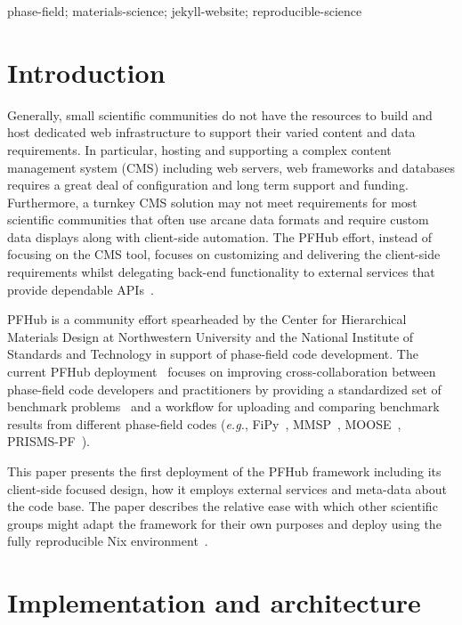 \documentclass{jors}
\begin{document}
phase-field; materials-science; jekyll-website; reproducible-science

\section*{Introduction}

Generally, small scientific communities do not have the resources to
build and host dedicated web infrastructure to support their varied
content and data requirements. In particular, hosting and supporting a
complex content management system (CMS) including web servers, web
frameworks and databases requires a great deal of configuration and
long term support and funding. Furthermore, a turnkey CMS solution may
not meet requirements for most scientific communities that often use
arcane data formats and require custom data displays along with
client-side automation. The PFHub effort, instead of focusing on the
CMS tool, focuses on customizing and delivering the client-side
requirements whilst delegating back-end functionality to external
services that provide dependable APIs~\cite{cmsfree}.

PFHub is a community effort spearheaded by the Center for Hierarchical
Materials Design at Northwestern University and the National Institute
of Standards and Technology in support of phase-field code
development. The current PFHub deployment~\cite{pfhub} focuses on
improving cross-collaboration between phase-field code developers and
practitioners by providing a standardized set of benchmark
problems~\cite{bm1, bm2} and a workflow for uploading and comparing
benchmark results from different phase-field codes (\emph{e.g.},
FiPy~\cite{fipy}, MMSP~\cite{mmsp}, MOOSE~\cite{moose},
PRISMS-PF~\cite{prisms-pf}).

This paper presents the first deployment of the PFHub framework
including its client-side focused design, how it employs external
services and meta-data about the code base. The paper describes the
relative ease with which other scientific groups might adapt the
framework for their own purposes and deploy using the fully
reproducible Nix environment~\cite{nix}.

\section*{Implementation and architecture}
\end{document}
